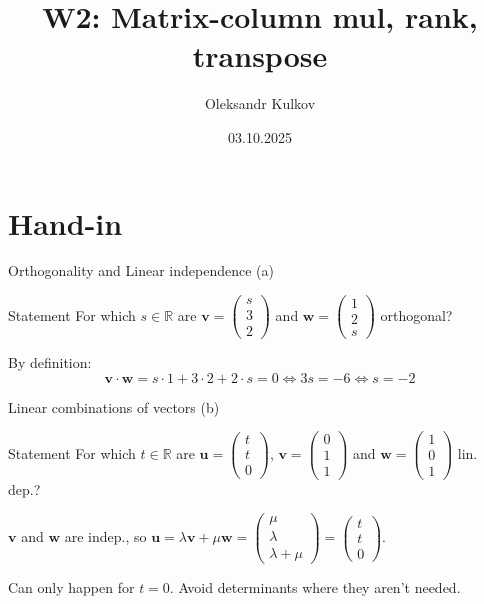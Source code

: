 \documentclass[10pt]{beamer}
\title{W2: Matrix-column mul, rank, transpose}
\date{03.10.2025}
\author{Oleksandr Kulkov}
\institute{ETH Zürich}
\begin{document}
\maketitle

\section{Hand-in}
\begin{frame}{Orthogonality and Linear independence (a)}
    \begin{block}{Statement}
        For which $s \in \mathbb R$ are $\mathbf v = \begin{pmatrix}s \\ 3 \\ 2\end{pmatrix}$ and $\mathbf w = \begin{pmatrix}1 \\ 2 \\ s\end{pmatrix}$ orthogonal?
    \end{block}
    By definition:
    $$\mathbf v \cdot \mathbf w = s \cdot 1 + 3 \cdot 2 + 2 \cdot s = 0 \iff 3s = -6 \iff s = -2$$
\end{frame}

\begin{frame}{Linear combinations of vectors (b)}
    \begin{block}{Statement}
    For which $t \in \mathbb R$ are $\mathbf u = \begin{pmatrix}t \\ t \\ 0\end{pmatrix}$, $\mathbf v = \begin{pmatrix}0 \\ 1 \\ 1\end{pmatrix}$ and $\mathbf w = \begin{pmatrix}1 \\ 0 \\ 1\end{pmatrix}$ lin. dep.?    
    \end{block}
    $\mathbf v$ and $\mathbf w$ are indep., so $\mathbf u = \lambda \mathbf v + \mu \mathbf w = \begin{pmatrix} \mu \\ \lambda \\ \lambda + \mu\end{pmatrix} = \begin{pmatrix}t \\ t \\ 0\end{pmatrix}$.

    Can only happen for $t=0$. Avoid determinants where they aren't needed.
\end{frame}
\end{document}
